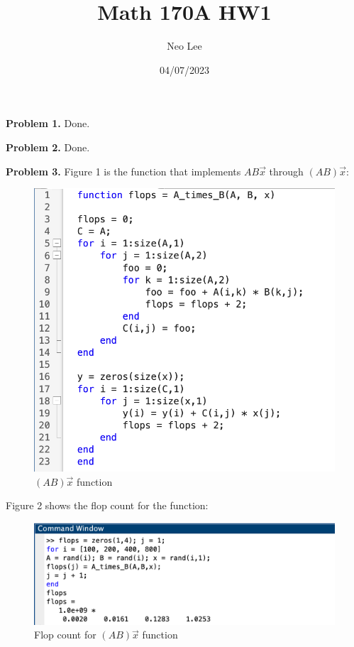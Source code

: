 \documentclass{article}
\title{Math 170A HW1}
\author{Neo Lee}
\date{04/07/2023}
\begin{document}
 

\maketitle 

\textbf{Problem 1.} Done.
\bigbreak

\textbf{Problem 2.} Done.
\bigbreak

\textbf{Problem 3.} 
Figure 1 is the function that implements $AB\vec{x}$ through $(AB)\vec{x}$: 
\begin{figure}[h]
    \centering
    \includegraphics[scale = 0.5]{A_times_B_function.png}
    \caption{$(AB)\vec{x}$ function}
\end{figure}

Figure 2 shows the flop count for the function:
\begin{figure}[h]
    \centering
    \includegraphics[scale = 0.5]{A_times_B_flops.png}
    \caption{Flop count for $(AB)\vec{x}$ function}
\end{figure}
\pagebreak
\end{document}
